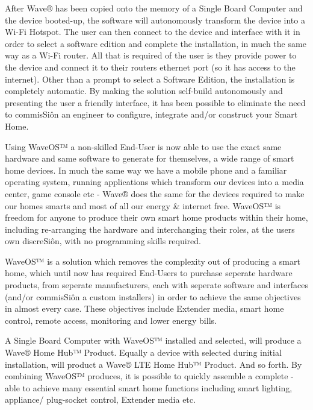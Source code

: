 \documentclass[letterpaper,10pt,openany,oneside,english]{sphinxmanual}
\begin{document}
After Wave® has been copied onto the memory of a Single Board Computer and the device booted-up, the software will autonomously transform the device into a Wi-Fi Hotspot. The user can then connect to the device and interface with it in order to select a software edition and complete the installation, in much the same way as a Wi-Fi router. All that is required of the user is they provide power to the device and connect it to their routers ethernet port (so it has access to the internet). Other than a prompt to select a Software Edition, the installation is completely automatic. By making the solution self-build autonomously and presenting the user a friendly interface, it has been possible to eliminate the need to commisSiôn an engineer to configure, integrate and/or construct your Smart Home.

Using WaveOS™ a non-skilled End-User is now able to use the exact same hardware and same software to generate for themselves, a wide range of smart home devices. In much the same way we have a mobile phone and a familiar operating system, running applications which transform our devices into a media center, game console etc - Wave® does the same for the devices required to make our homes smarts and most of all our energy \& internet free. WaveOS™ is freedom for anyone to produce their own smart home products within their home, including re-arranging the hardware and interchanging their roles, at the users own discreSiôn, with no programming skills required.

WaveOS™ is a solution which removes the complexity out of producing a smart home, which until now has required End-Users to purchase seperate hardware products, from seperate manufacturers, each with seperate software and interfaces (and/or commisSiôn a custom installers) in order to achieve the same objectives in almost every case. These objectives include Extender media, smart home control, remote access, monitoring and lower energy bills.

A Single Board Computer with WaveOS™ installed and  selected, will produce a Wave® Home Hub™ Product. Equally a device with  selected during initial installation, will product a Wave® LTE Home Hub™ Product. And so forth. By combining  WaveOS™ produces, it is possible to quickly assemble a complete  - able to achieve many essential smart home functions including smart lighting, appliance/ plug-socket control, Extender media etc.
\end{document}
